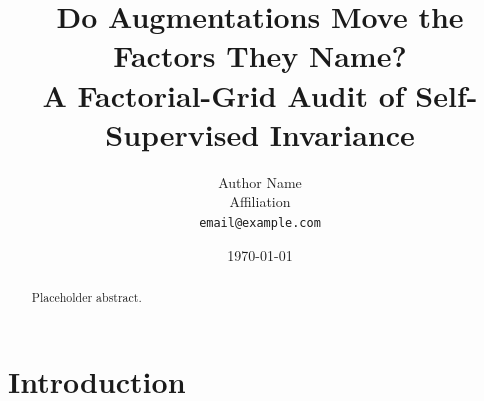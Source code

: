 \documentclass[11pt]{article}
\title{Do Augmentations Move the Factors They Name? \\
A Factorial-Grid Audit of Self-Supervised Invariance}
\author{Author Name \\ Affiliation \\ \texttt{email@example.com}}
\date{\today}
\begin{document}
\maketitle

\begin{abstract}
Placeholder abstract.
\end{abstract}

\section{Introduction}
\label{sec:intro}
%
%
\end{document}

